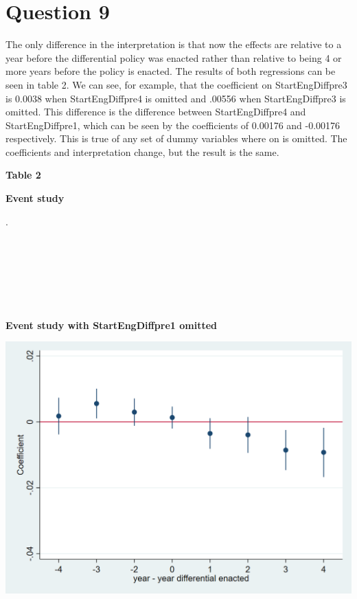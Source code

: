 \documentclass[11pt]{article}
\begin{document}
\section{Question 9} 

The only difference in the interpretation is that now the effects are relative to a year before the differential policy was enacted rather than relative to being 4 or more years before the policy is enacted. The results of both regressions can be seen in table 2. We can see, for example, that the coefficient on StartEngDiffpre3 is 0.0038 when StartEngDiffpre4 is omitted and .00556 when StartEngDiffpre3 is omitted. This difference is the difference between StartEngDiffpre4 and StartEngDiffpre1, which can be seen by the coefficients of 0.00176 and -0.00176 respectively.
This is true of any set of dummy variables where on is omitted. The coefficients and interpretation change, but the result is the same. 
 
 \begin{center}
 	
 	\centering
 	\LARGE{\textbf{Table 2}}\par\medskip
 	
 	\normalsize{\textbf{Event study}}\par\medskip
 	\scalebox{1}{
 		
 	}
 \end{center}
 .\\
 \\
 \\
 \\\\
 \\
 \\
 
 
  \begin{center}
 	
 	\centering
 	\textbf{Event study with StartEngDiffpre1 omitted }\par\medskip
 	\includegraphics[width=1\linewidth]{ps1_figure_eng_share2.png}
 \end{center}
 
\end{document}
